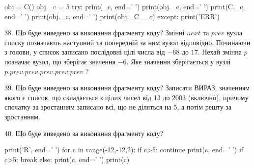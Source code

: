 \documentclass[11pt]{article}
\begin{document}
obj = C()
obj._c = 5
try:
    print(_c, end=' ')
    print(obj._c, end=' ')
    print(C._c, end=' ')
    print(obj._c, end=' ')
    print(obj._C__c)
except:
    print('ERR')

38. Що буде виведено за виконання фрагменту коду?
Змінні $next$ та $prev$ вузла списку позначають наступний та попередній за ним вузол відповідно. Починаючи з голови, у список записано послідовні цілі числа від $-68$ до $17$. Нехай змінна $p$ позначає вузол, що зберігає значення $-6$.
Яке значення зберігається у вузлі $p.prev.prev.prev.prev.prev$ ?

39. Що буде виведено за виконання фрагменту коду?
Записати ВИРАЗ, значенням якого є список, що складається з цілих чисел від 13 до 2003 (включно), причому спочатку за зростанням записано всі, що не діляться на 5, а потім решту за зростанням.

40. Що буде виведено за виконання фрагменту коду?

print('R', end=' ')
for c in range(-12,-12,2):
    if c>5:
        continue
        print(c, end=' ')
    if c>5:
        break
    else:
        print(c, end=' ')
    print(c)









































\newpage
\end{document}
